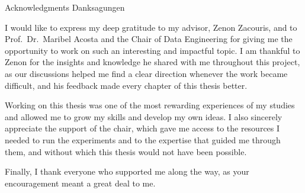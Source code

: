 \makeatletter
{}
{}
{}
\makeatother
\thispagestyle{empty}

\vspace*{20mm}

\begin{center}
  \makeatletter
  { Acknowledgments}
  { Danksagungen}
  \makeatother
\end{center}

\vspace{10mm}

I would like to express my deep gratitude to my advisor, Zenon Zacouris, and to
Prof.\ Dr.\ Maribel Acosta and the Chair of Data Engineering for giving me
the opportunity to work on such an interesting and impactful topic. I am
thankful to Zenon for the insights and knowledge he shared with me throughout
this project, as our discussions helped me find a clear direction whenever the
work became difficult, and his feedback made every chapter of this thesis
better.

Working on this thesis was one of the most rewarding experiences of my
studies and allowed me to grow my skills and develop my own ideas. I also
sincerely appreciate the support of the chair, which gave me access to the
resources I needed to run the experiments and to the expertise that guided me
through them, and without which this thesis would not have been possible.

Finally, I thank everyone who supported me along the way, as your
encouragement meant a great deal to me.



\cleardoublepage{}
